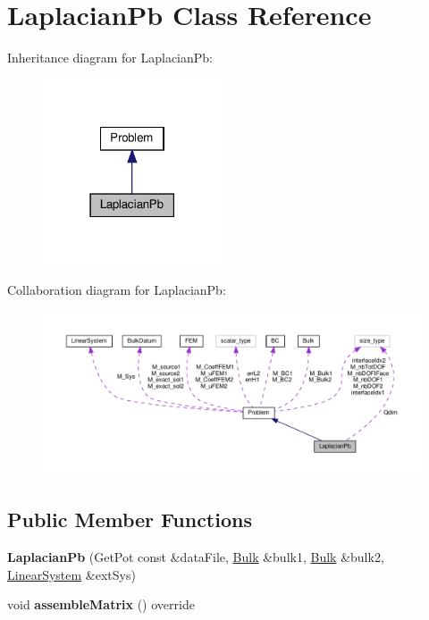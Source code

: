 \hypertarget{classLaplacianPb}{}\section{Laplacian\+Pb Class Reference}
\label{classLaplacianPb}


Inheritance diagram for Laplacian\+Pb\+:
\nopagebreak
\begin{figure}[H]
\begin{center}
\leavevmode
\includegraphics[width=150pt]{classLaplacianPb__inherit__graph}
\end{center}
\end{figure}


Collaboration diagram for Laplacian\+Pb\+:
\nopagebreak
\begin{figure}[H]
\begin{center}
\leavevmode
\includegraphics[width=350pt]{classLaplacianPb__coll__graph}
\end{center}
\end{figure}
\subsection*{Public Member Functions}
\begin{DoxyCompactItemize}
\item 
\mbox{\label{classLaplacianPb_a23d66dc47132d2e44b7a7ab4194e60be}} 
{\bfseries Laplacian\+Pb} (Get\+Pot const \&data\+File, \hyperlink{classBulk}{Bulk} \&bulk1, \hyperlink{classBulk}{Bulk} \&bulk2, \hyperlink{classLinearSystem}{Linear\+System} \&ext\+Sys)
\item 
\mbox{\label{classLaplacianPb_aa8baaaebc51fdb33f1e4ec3b810efc56}} 
void {\bfseries assemble\+Matrix} () override
\end{DoxyCompactItemize}
